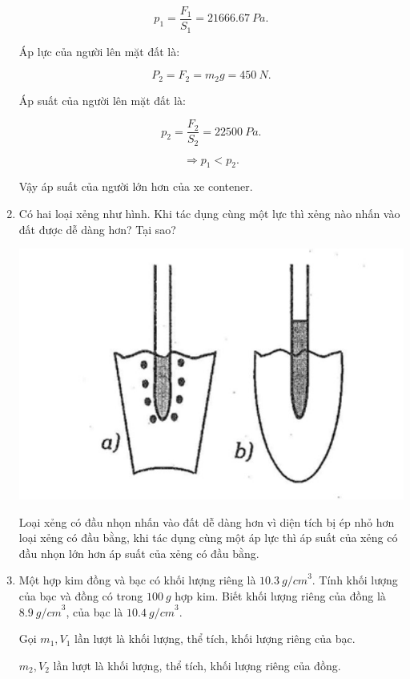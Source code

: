 \begin{enumerate}[label=\bfseries Câu \arabic*:]
{		$$p_1=\dfrac{F_1}{S_1}=\SI{21666,67}{Pa}.$$
		
		Áp lực của người lên mặt đất là:
		
		$$P_2=F_2=m_2g=\SI{450}{N}.$$
		
		Áp suất của người lên mặt đất là:
		
		$$p_2=\dfrac{F_2}{S_2}= \SI{22500}{Pa}.$$
		
		$$\Rightarrow p_1 < p_2.$$
		
		Vậy áp suất của người lớn hơn của xe contener.
	}
	\item {}
	
	
	{
		Có hai loại xẻng như hình. Khi tác dụng cùng một lực thì xẻng nào nhấn vào đất được dễ dàng hơn? Tại sao?
		\begin{center}
			\includegraphics[scale=0.35]{../figs/VN10-2022-PH-TP036-1.jpg}
		\end{center}
		
	}
	
	\hideall
	{	
		Loại xẻng có đầu nhọn nhấn vào đất dễ dàng hơn vì diện tích bị ép nhỏ hơn loại xẻng có đầu bằng, khi tác dụng cùng một áp lực thì áp suất của xẻng có đầu nhọn lớn hơn áp suất của xẻng có đầu bằng.
	}
		\item {}
	
	
	{
		Một hợp kim đồng và bạc có khối lượng riêng là $\SI{10,3}{g/cm}^3$. Tính khối lượng của bạc và đồng có trong $\SI{100}{g}$ hợp kim. Biết khối lượng riêng của đồng là $\SI{8,9}{g/cm}^3$, của bạc là $\SI{10,4}{g/cm}^3$.
	}
	
	\hideall
	{	
		Gọi $m_1, V_1$ lần lượt là khối lượng, thể tích, khối lượng riêng của bạc.
		
		$m_2, V_2$ lần lượt là khối lượng, thể tích, khối lượng riêng của đồng.
		
}
\end{enumerate}
